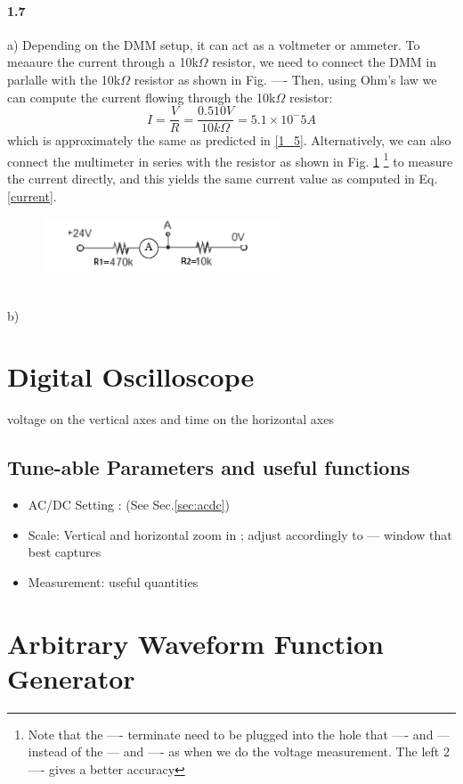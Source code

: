 \documentclass[10pt,letterpaper,oneside] {article}
\begin{document}
\paragraph{\textbf{1.7}} 
a) Depending on the DMM setup, it can act as a voltmeter or ammeter. To meaaure the current through a 10k$\Omega$ resistor, we need to connect the DMM in parlalle with the 10k$\Omega$ resistor as shown in Fig. ---- 
Then, using Ohm's law we can compute the current flowing through the 10k$\Omega$ resistor: 
\begin{equation}
I = \frac{V}{R}=\frac{0.510V}{10k\Omega}=5.1\times 10^-5 A
\label{current}
\end{equation}
which is approximately the same as predicted in \ref{1_5}. Alternatively, we can also connect the multimeter in series with the resistor as shown in Fig. \ref{ammeter}  \footnote{Note that the ---- terminate need to be plugged into the hole that  ---- and --- instead of the --- and ---- as when we do the voltage measurement. The left 2 ---- gives a better accuracy} to measure the current directly, and this yields the same current value as computed in Eq.\ref{current}.
\begin{figure}[h!]
\center
\includegraphics[width=200pt]{figure/ammeter}
\label{ammeter}
\end{figure}
\\
b)  
\section{Digital Oscilloscope}
voltage on the vertical axes and time on the horizontal axes
\subsection{Tune-able Parameters and useful functions}
\begin{itemize}
\item AC/DC Setting : (See Sec.\ref{sec:acdc})
\item Scale: Vertical and horizontal zoom in ; adjust accordingly to --- window that best captures
\item Measurement: useful quantities 
\end{itemize}
\section{Arbitrary Waveform Function Generator}
\end{document}
